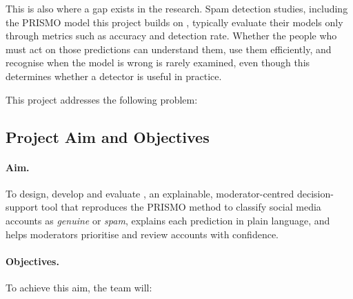 This is also where a gap exists in the research. Spam detection studies, including the PRISMO model this project builds on \parencite{agrawal2018prismo}, typically evaluate their models only through metrics such as accuracy and detection rate. Whether the people who must act on those predictions can understand them, use them efficiently, and recognise when the model is wrong is rarely examined, even though this determines whether a detector is useful in practice.

This project addresses the following problem:

\begin{center}
\end{center}

\subsection{Project Aim and Objectives}\label{sec:objectives}

\paragraph{Aim.} To design, develop and evaluate \textbf{\projectname}, an explainable, moderator-centred decision-support tool that reproduces the PRISMO method to classify social media accounts as \emph{genuine} or \emph{spam}, explains each prediction in plain language, and helps moderators prioritise and review accounts with confidence.

\paragraph{Objectives.} To achieve this aim, the team will:

